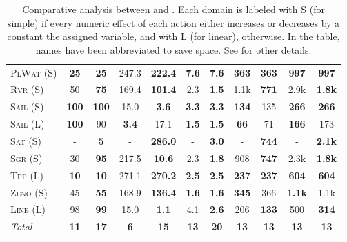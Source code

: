 \documentclass[11pt,landscape]{article}
\begin{document}
\begin{table*}[tb]
{\begin{tabular}{|l||cc||cc||cc||cc||cc||}
\textsc{PlWat} (S)&\textbf{25}&\textbf{25}&247.3&\textbf{222.4}&\textbf{7.6}&\textbf{7.6}&\textbf{363}&\textbf{363}&\textbf{997}&\textbf{997}\\
\textsc{Rvr} (S)&50&\textbf{75}&169.4&\textbf{101.4}&2.3&\textbf{1.5}&1.1k&\textbf{771}&2.9k&\textbf{1.8k}\\
\textsc{Sail} (S)&\textbf{100}&\textbf{100}&15.0&\textbf{3.6}&\textbf{3.3}&\textbf{3.3}&\textbf{134}&135&\textbf{266}&\textbf{266}\\
\textsc{Sail} (L)&\textbf{100}&90&\textbf{3.4}&17.1&\textbf{1.5}&\textbf{1.5}&\textbf{66}&71&\textbf{166}&173\\
\textsc{Sat} (S)&-&\textbf{5}&-&\textbf{286.0}&-&\textbf{3.0}&-&\textbf{744}&-&\textbf{2.1k}\\
\textsc{Sgr} (S)&30&\textbf{95}&217.5&\textbf{10.6}&2.3&\textbf{1.8}&908&\textbf{747}&2.3k&\textbf{1.8k}\\
\textsc{Tpp} (L)&\textbf{10}&\textbf{10}&271.1&\textbf{270.2}&\textbf{2.5}&\textbf{2.5}&\textbf{237}&\textbf{237}&\textbf{604}&\textbf{604}\\
\textsc{Zeno} (S)&45&\textbf{55}&168.9&\textbf{136.4}&\textbf{1.6}&\textbf{1.6}&\textbf{345}&366&\textbf{1.1k}&1.1k\\
\textsc{Line} (L)&98&\textbf{99}&15.0&\textbf{1.1}&4.1&\textbf{2.6}&206&\textbf{133}&500&\textbf{314}
\\\hline
\textit{Total}&\textbf{11}&\textbf{17}&\textbf{6}&\textbf{15}&\textbf{13}&\textbf{20}&\textbf{13}&\textbf{13}&\textbf{13}&\textbf{13}\\\hline

        \end{tabular}}
        \caption{Comparative analysis between  \pattya and \pattye. Each domain is labeled with S (for simple) if every numeric effect of each action either increases or decreases by a constant the assigned variable, and with L (for linear), otherwise. In the table, names have been abbreviated to save space.  See \cite{ipc2023} for other details.}
        \label{tab:exp-patty-a-patty-e}
        \end{table*}
        
\end{document}
